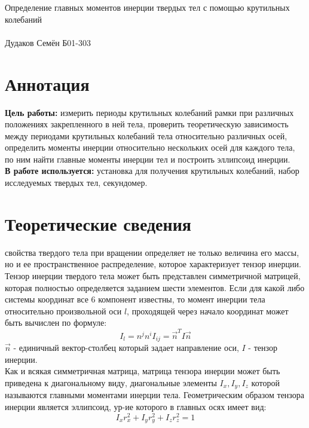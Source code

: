 \documentclass[a4paper, 10pt]{article}%
\begin{document}
	\begin{center}
		\LARGE{Определение главных моментов инерции твердых тел с помощью крутильных колебаний}\\[0.2cm]
        $ $\\
		\large{Дудаков Семён Б01-303}\\[0.2cm]
	\end{center}

\section{Аннотация}


\quad\quad\textbf{Цель работы:} измерить периоды крутильных колебаний рамки при различных положениях закрепленного
в ней тела, проверить теоретическую зависимость между периодами крутильных колебаний тела
относительно различных осей, определить моменты инерции относительно нескольких осей для каждого тела, 
по ним найти главные моменты инерции тел и построить эллипсоид инерции.\\

\textbf{В работе используется:} установка для получения крутильных колебаний, набор исследуемых твердых тел, секундомер.

\section{Теоретические сведения}

\quad{} свойства твердого тела при вращении определяет не только величина его массы, но и ее пространственное распределение, которое характеризует тензор инерции. Тензор инерции твердого тела может быть представлен симметричной матрицей, которая полностью определяется заданием шести элементов. 
Если для какой либо системы координат все 6 компонент известны, то момент инерции тела относительно
 произвольной оси $l$, проходящей через начало координат может быть вычислен по формуле:
\begin{equation}
    I_{l}=n^{j}n^{i}I_{ij}=\overrightarrow{n}^{T} I \overrightarrow{n} 
\end{equation}
\quad{} $\overrightarrow{n}$ - единичный вектор-столбец который задает направление оси, $I$ - тензор инерции.\\

Как и всякая симметричная матрица, матрица тензора инерции может быть приведена к диагональному виду, диагональные элементы $I_{x}, I_{y}, I_{z}$ которой называются главными моментами инерции тела. Геометрическим образом тензора инерции является эллипсоид, ур-ие которого в главных осях имеет вид:
\begin{equation}
    I_{x}r^{2}_{x}+I_{y}r^{2}_{y}+I_{z}r^{2}_{z} = 1
\end{equation}
\end{document}
